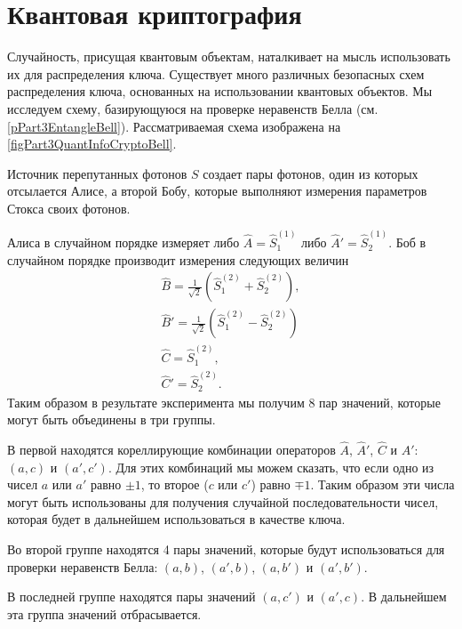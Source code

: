 \section{Квантовая криптография}
\label{subsecPart3QuantInfoQuantCrypto}
Случайность, присущая квантовым объектам, наталкивает на мысль
использовать их для распределения ключа. Существует много различных
безопасных схем распределения ключа, основанных на использовании
квантовых объектов. Мы исследуем схему, базирующуюся на проверке
неравенств Белла (см. \ref{pPart3EntangleBell}). Рассматриваемая схема
изображена на \autoref{figPart3QuantInfoCryptoBell}.



Источник перепутанных фотонов  $S$ создает пары фотонов,
один из которых отсылается Алисе, а второй Бобу, которые выполняют
измерения параметров Стокса своих фотонов. 

Алиса в случайном порядке измеряет либо $\hat{A} = \hat{S}_1^{(1)}$
либо $\hat{A}' = \hat{S}_2^{(1)}$. Боб в случайном порядке производит
измерения следующих величин 
\begin{eqnarray}
\hat{B} = \frac{1}{\sqrt{2}}\left(\hat{S}_1^{(2)} +
  \hat{S}_2^{(2)}\right), 
\nonumber \\
\hat{B}' = \frac{1}{\sqrt{2}}\left(\hat{S}_1^{(2)} - \hat{S}_2^{(2)}\right)
\nonumber \\
\hat{C} = \hat{S}_1^{(2)},
\nonumber \\
\hat{C}' = \hat{S}_2^{(2)}.
\nonumber
\end{eqnarray}
Таким образом в результате эксперимента мы получим 8 пар значений,
которые могут быть объединены в три группы. 

В первой находятся
кореллирующие комбинации операторов $\hat{A}$, $\hat{A}'$, $\hat{C}$ и
$\hat{A}'$: $\left(a, c\right)$ и $\left(a', c'\right)$. Для этих
комбинаций мы можем сказать, что если одно из чисел $a$ или $a'$
равно $\pm 1$, то второе ($c$ или $c'$) равно $\mp 1$. Таким образом
эти числа могут быть использованы для получения случайной
последовательности чисел, которая будет в дальнейшем использоваться в
качестве ключа. 

Во второй группе находятся 4 пары значений, которые будут
использоваться для проверки неравенств Белла: $\left(a, b\right)$,
$\left(a', b\right)$, $\left(a, b'\right)$ и $\left(a', b'\right)$.

В последней группе находятся пары значений $\left(a, c'\right)$ и
$\left(a', c\right)$. В дальнейшем эта группа значений отбрасывается.

